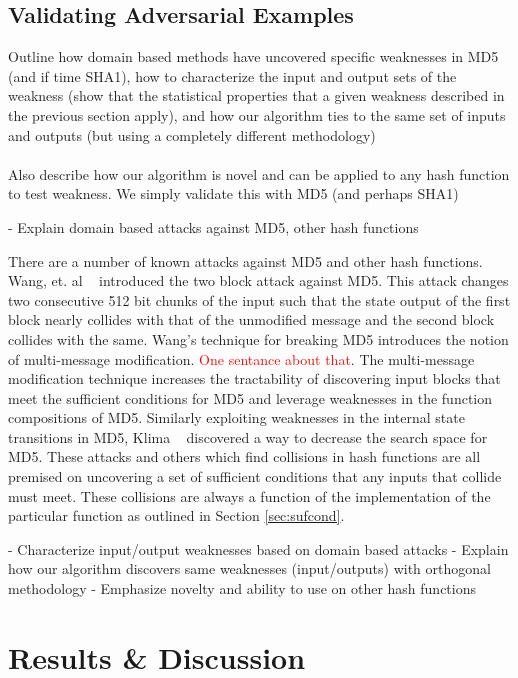 \documentclass[letterpaper,twocolumn,10pt]{article}
\begin{document}
\subsection{Validating Adversarial Examples}
Outline how domain based methods have uncovered specific weaknesses in MD5 (and if time SHA1), how to characterize the input and output sets of the weakness (show that the statistical properties that a given weakness described in the previous section apply), and how our algorithm ties to the same set of inputs and outputs (but using a completely different methodology)
\\
\\
Also describe how our algorithm is novel and can be applied to any hash function to test weakness. We simply validate this with MD5 (and perhaps SHA1)


- Explain domain based attacks against MD5, other hash functions 

There are a number of known attacks against MD5 and other hash functions. Wang, et. al ~\cite{wang2005break} introduced the two block attack against MD5. This attack changes two consecutive 512 bit chunks of the input such that the state output of the first block nearly collides with that of the unmodified message and the second block collides with the same. Wang's technique for breaking MD5 introduces the notion of multi-message modification. \textcolor{red}{One sentance about that}. The multi-message modification technique increases the tractability of discovering input blocks that meet the sufficient conditions for MD5 and leverage weaknesses in the function compositions of MD5. Similarly exploiting weaknesses in the internal state transitions in MD5, Klima ~\cite{klima2005finding} discovered a way to decrease the search space for MD5. These attacks and others which find collisions in hash functions are all premised on uncovering a set of sufficient conditions that any inputs that collide must meet. These collisions are always a function of the implementation of the particular function as outlined in Section \ref{sec:sufcond}.

- Characterize input/output weaknesses based on domain based attacks 
- Explain how our algorithm discovers same weaknesses (input/outputs) with orthogonal methodology
- Emphasize novelty and ability to use on other hash functions 

\section{Results \& Discussion}
\end{document}

